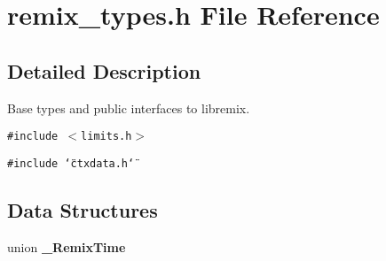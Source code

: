 \section{remix\_\-types.h File Reference}
\label{remix__types_8h}


\subsection{Detailed Description}
Base types and public interfaces to libremix. 



{\tt \#include $<$limits.h$>$}\par
{\tt \#include \char`\"{}ctxdata.h\char`\"{}}\par
\subsection*{Data Structures}
\begin{CompactItemize}
\item 
union {\bf \_\-Remix\-Time}
\end{CompactItemize}
